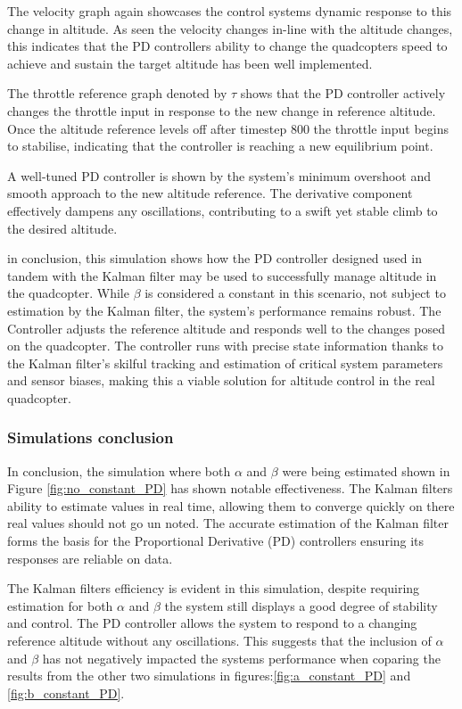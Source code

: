 \documentclass{report}
\begin{document}
The velocity graph again showcases the control systems dynamic response to this
change in altitude. As seen the velocity changes in-line with the altitude
changes, this indicates that the PD controllers ability to change the
quadcopters speed to achieve and sustain the target altitude has been well
implemented.

The throttle reference graph denoted by \(\tau\) shows that the PD controller
actively changes the throttle input in response to the new change in reference
altitude. Once the altitude reference levels off after timestep 800 the throttle
input begins to stabilise, indicating that the controller is reaching a new
equilibrium point.
 
A well-tuned PD controller is shown by the system's minimum overshoot and smooth
approach to the new altitude reference. The derivative component effectively
dampens any oscillations, contributing to a swift yet stable climb to the
desired altitude.

in conclusion, this simulation shows how the PD controller designed used in
tandem with the Kalman filter may be used to successfully manage altitude in the
quadcopter. While \(\beta\) is considered a constant in this scenario, not
subject to estimation by the Kalman filter, the system's performance remains
robust. The Controller adjusts the reference altitude and responds well to the
changes posed on the quadcopter. The controller runs with precise state
information thanks to the Kalman filter's skilful tracking and estimation of
critical system parameters and sensor biases, making this a viable solution for
altitude control in the real quadcopter.


\subsubsection*{Simulations conclusion}
In conclusion, the simulation where both \(\alpha\) and \(\beta\) were being
estimated shown in Figure \ref{fig:no_constant_PD} has shown notable
effectiveness. The Kalman filters ability to estimate values in real time,
allowing them to converge quickly on there real values should not go un noted.
The accurate estimation of the Kalman filter forms the basis for the
Proportional Derivative (PD) controllers ensuring its responses are reliable on
data.

The Kalman filters efficiency is evident in this simulation, despite requiring
estimation for both \(\alpha\) and \(\beta\) the system still displays a good
degree of stability and control. The PD controller allows the system to respond
to a changing reference altitude without any oscillations. This suggests that
the inclusion of \(\alpha\) and \(\beta\) has not negatively impacted the
systems performance when coparing the results from the other two simulations in
figures:\ref{fig:a_constant_PD} and \ref{fig:b_constant_PD}.
\end{document}
